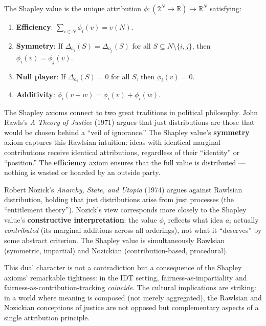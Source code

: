 \begin{theorem}
\label{thm:shapley-axioms}
The Shapley value is the unique attribution $\phi\colon (2^N \to \mathbb{R})
\to \mathbb{R}^N$ satisfying:
\begin{enumerate}
\item \textbf{Efficiency}: $\sum_{i \in N} \phi_i(v) = v(N)$.
\item \textbf{Symmetry}: If $\Delta_{a_i}(S) = \Delta_{a_j}(S)$ for all
  $S \subseteq N \setminus \{i,j\}$, then $\phi_i(v) = \phi_j(v)$.
\item \textbf{Null player}: If $\Delta_{a_i}(S) = 0$ for all $S$, then
  $\phi_i(v) = 0$.
\item \textbf{Additivity}: $\phi_i(v + w) = \phi_i(v) + \phi_i(w)$.
\end{enumerate}
\end{theorem}

\begin{interpretation}
\label{interp:ch21:rawls_nozick_justice}
The Shapley axioms connect to two great traditions in political philosophy.
John Rawls's \textit{A Theory of Justice} (1971) argues that just
distributions are those that would be chosen behind a ``veil of ignorance.''
The Shapley value's \textbf{symmetry} axiom captures this Rawlsian
intuition: ideas with identical marginal contributions receive identical
attributions, regardless of their ``identity'' or ``position.''  The
\textbf{efficiency} axiom ensures that the full value is distributed ---
nothing is wasted or hoarded by an outside party.

Robert Nozick's \textit{Anarchy, State, and Utopia} (1974) argues against
Rawlsian distribution, holding that just distributions arise from just
processes (the ``entitlement theory'').  Nozick's view corresponds more
closely to the Shapley value's \textbf{constructive interpretation}: the
value $\phi_i$ reflects what idea $a_i$ actually \emph{contributed} (its
marginal additions across all orderings), not what it ``deserves'' by some
abstract criterion.  The Shapley value is simultaneously Rawlsian (symmetric,
impartial) and Nozickian (contribution-based, procedural).

This dual character is not a contradiction but a consequence of the Shapley
axioms' remarkable tightness: in the IDT setting, fairness-as-impartiality
and fairness-as-contribution-tracking \emph{coincide}.  The cultural
implications are striking: in a world where meaning is composed (not
merely aggregated), the Rawlsian and Nozickian conceptions of justice
are not opposed but complementary aspects of a single attribution principle.
\end{interpretation}

